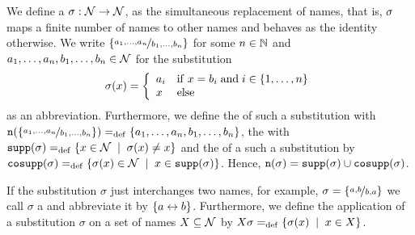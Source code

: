 \begin{definition}[Substitution]
\label{def_substitution}
We define a  $\sigma:\mathcal N\rightarrow\mathcal N$, as the simultaneous replacement of names, that is, $\sigma$ maps a finite number of names to other names and behaves as the identity otherwise. We write $\left\{\nicefrac{a_1,\ldots,a_n}{b_1,\ldots,b_n}\right\}$ for some $n\in\mathbb N$ and $a_1,\ldots,a_n,b_1,\ldots,b_n\in\mathcal N$ for the substitution
	\[\substF(x) =\left\{\begin{array}{ll}
									a_i & \falls\; x=b_i \;\text{and} \; i\in\set{1,\ldots,n}\\
									x & \text{else}
									\end{array}
								\right.\]
	as an abbreviation. Furthermore, we define the  of such a substitution with $\n{\subs{a_1,\ldots,a_n}{b_1,\ldots,b_n}}\define\set{a_1,\ldots,a_n,b_1,\ldots,b_n}$, the  with $\supp{\sigma}\define\set[\substF(x)\neq{}x]{x\in\names}$ and the  of a such a substitution by $\cosupp{\sigma}\define\set[x\in\supp{\substF}]{\substF(x)\in\names}$. Hence, $\mathtt{n}(\sigma)=\mathtt{supp}(\sigma)\cup\mathtt{cosupp}(\sigma)$. 

If the substitution $\sigma$ just interchanges two names, for example, $\sigma=\left\{\nicefrac{a,b}{b,a}\right\}$ we call $\sigma$ a  and abbreviate it by $\left\{a\leftrightarrow{}b\right\}$. Furthermore, we define the application of a substitution $\sigma$ on a set of names $X\subseteq\mathcal N$ by $X\sigma\define\set[x\in{}X]{\sigma(x)}$.


\end{definition}
